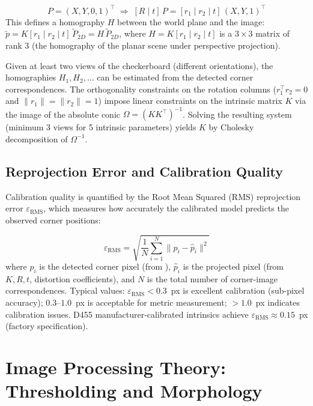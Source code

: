 \begin{eqblock}
\begin{equation}
P = (X,Y,0,1)^\top \;\Rightarrow\; [R\mid t]\,P = [r_1 \mid r_2 \mid t]\,(X,Y,1)^\top
\end{equation}
This defines a homography $H$ between the world plane and the image: $\tilde p = K[r_1\mid r_2\mid t]\,\tilde P_{2D} = H\,\tilde P_{2D}$, where $H = K[r_1\mid r_2\mid t]$ is a $3\times3$ matrix of rank 3 (the homography of the planar scene under perspective projection).
\end{eqblock}

Given at least two views of the checkerboard (different orientations), the homographies $H_1, H_2, \dots$ can be estimated from the detected corner correspondences. The orthogonality constraints on the rotation columns ($r_1^\top r_2 = 0$ and $\|r_1\|=\|r_2\|=1$) impose linear constraints on the intrinsic matrix $K$ via the image of the absolute conic $\Omega = (KK^\top)^{-1}$. Solving the resulting system (minimum 3 views for 5 intrinsic parameters) yields $K$ by Cholesky decomposition of $\Omega^{-1}$.

\subsection{Reprojection Error and Calibration Quality}

Calibration quality is quantified by the Root Mean Squared (RMS) reprojection error $\varepsilon_{\text{RMS}}$, which measures how accurately the calibrated model predicts the observed corner positions:

\begin{eqblock}
\begin{equation}
\varepsilon_{\text{RMS}} = \sqrt{\frac{1}{N}\sum_{i=1}^{N} \|p_i - \hat p_i\|^2}
\end{equation}
where $p_i$ is the detected corner pixel (from ), $\hat p_i$ is the projected pixel (from $K, R, t$, distortion coefficients), and $N$ is the total number of corner-image correspondences. Typical values: $\varepsilon_{\text{RMS}} < 0.3$~px is excellent calibration (sub-pixel accuracy); $0.3$--$1.0$~px is acceptable for metric measurement; $>1.0$~px indicates calibration issues. D455 manufacturer-calibrated intrinsics achieve $\varepsilon_{\text{RMS}} \approx 0.15$~px (factory specification).
\end{eqblock}

\section{Image Processing Theory: Thresholding and Morphology}

